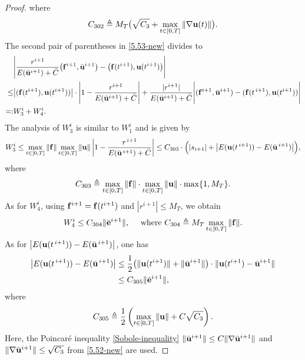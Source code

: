 \documentclass{article}
\theoremstyle{definition}                   %
\begin{document}
\begin{proof}
where
\begin{equation}
C_{302} \triangleq  M_T \bigl(\sqrt{C_3} + \max_{t\in[0,T]} \|\nabla{\bf u}(t)\| \bigr).
\label{def_C302}
\end{equation}
%
The second pair of parentheses in \eqref{5.53-new} divides to
\begin{align}
&\Biggl|
\frac{r^{i+1}}{E(\bar{\bf u}^{i+1}) + \bar C}
\bigl( {\bf f}^{i+1}, \bar{\bf u}^{i+1} \bigr)
- \bigl( {\bf f}(t^{i+1}), {\bf u}(t^{i+1}) \bigr)
\Biggr|  \notag\\
\le
& \bigl| ( {\bf f}(t^{i+1}), {\bf u}(t^{i+1}) ) \bigr|
\cdot \Biggl|
1 - \frac{r^{i+1}}{E(\bar{\bf u}^{i+1}) + \bar C}
\Biggr|  
+ \frac{|r^{i+1}|}{E(\bar{\bf u}^{i+1}) + \bar C}
\Biggl|
( {\bf f}^{i+1}, \bar{\bf u}^{i+1} )
- ( {\bf f}(t^{\,i+1}), {\bf u}(t^{i+1}) )
\Biggr| \notag \\
=:& W_3^i + W_4^i.
\label{5.61}
\end{align}
The analysis of $W_3^i$ is similar to $W_1^i$ and is given by
\begin{align}
W_3^i \le \max_{t\in [0,T]} \|{\bf f} \|
\max_{t\in [0,T]} \|{\bf u} \| 
\left|
1-\frac{r^{\,i+1}}{E(\bar{\bf u}^{\,i+1})+\bar{C}}
\right|
\le C_{303} \cdot 
\Bigl(|s_{i+1}|+ 
 \bigl|E({\bf u}(t^{\,i+1}))-E(\bar{\bf u}^{\,i+1})\bigr| 
\Bigr),
\label{5.62-new}
\end{align}
where 
\begin{align}
C_{303}\triangleq \max_{t\in [0,T]} \|{\bf f} \|\cdot
\max_{t\in [0,T]} \|{\bf u} \| \cdot 
\max\{1, M_T\}.
\label{def_C303}
\end{align}
As for $W_4^i$, using ${\bf f}^{i+1}={\bf f}(t^{i+1})$ and $|r^{i+1}|\le M_T$, we obtain
\begin{align}
W_4^i \le  C_{304} \|\bar{\bf e}^{i+1}\|,
 \quad \text{ where } 
 C_{304}\triangleq M_T \max_{t\in[0,T]} \|{\bf f}\|.
 \label{5.63-new}
\end{align}
%
As for $\bigl|E({\bf u}(t^{\,i+1}))-E(\bar{\bf u}^{\,i+1})\bigr|$, one has
\begin{align}
\bigl|E({\bf u}(t^{\,i+1}))-E(\bar{\bf u}^{\,i+1})\bigr| 
&\le \frac{1}{2} \bigl(\|{\bf u}(t^{i+1})\| + 
\| \bar{\bf u}^{i+1} \| \bigr)
\cdot 
\| {\bf u}(t^{i+1}) - \bar{\bf u}^{i+1}\|
\notag\\
& \le C_{305} \|\bar{\bf e}^{i+1} \|,
\label{5.64-new}
\end{align}
where
\begin{align}
C_{305}\triangleq \frac{1}{2}
\left( 
\max_{t\in [0,T]} \|{\bf u} \| 
+ C\sqrt{C_3} \right).
\label{def_C305}
\end{align}
Here, the Poincar\'{e} inequality \eqref{Sobole-inequality}  
$\| \bar{\bf u}^{i+1} \|\le C \|\nabla \bar{\bf u}^{i+1} \|$
and $\|\nabla \bar{\bf u}^{i+1} \|\le \sqrt{C_3}$ 
from \eqref{5.52-new} are used.
%


\end{proof}
\end{document}
